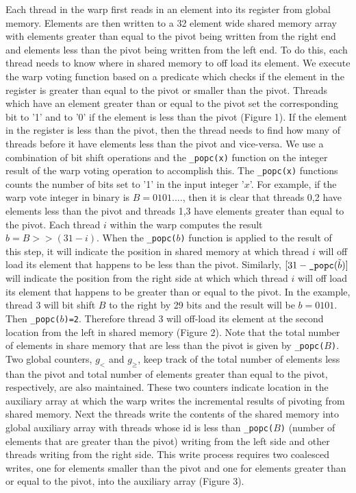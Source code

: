 \documentclass[10pt]{article}
\begin{document}
Each thread in the warp first reads in an element into its register from global memory. Elements are then written to a 32 element wide shared memory array with elements greater than equal to the pivot being written from the right end and elements less than the pivot being written from the left end. To do this, each thread needs to know where in shared memory to off load its element.  We execute the warp voting function based on a predicate which checks if the element in the register is greater than equal to the pivot or smaller than the pivot.  Threads which have an element greater than or equal to the pivot set the corresponding bit to '1' and to '0' if the element is less than the pivot (Figure 1). If the element in the register is less than the pivot, then the thread needs to find how many of threads before it have elements less than the pivot and vice-versa. We use a combination of bit shift operations and the \texttt{\_popc(x)} function on the integer result of the warp voting operation to accomplish this. The \texttt{\_popc(x)} functions counts the number of bits set to '1' in the input integer '$x$'. For example, if the warp vote integer in binary is $B=0101....$, then it is clear that threads 0,2  have elements less than the pivot and threads 1,3 have elements greater than equal to the pivot. Each thread $i$ within the warp computes the result $b=B>>(31-i)$.  When the  \texttt{\_popc($b$)} function is applied to the result of this step, it will indicate the position in shared memory at which thread $i$ will off load its element that happens to be less than the pivot. Similarly, $[31-\mbox{\texttt{\_popc}}(\tilde{b})]$ will indicate the position from the right side at which which thread $i$ will off load its element that happens to be greater than or equal to the pivot. In the example, thread 3 will bit shift $B$ to the right by 29 bits and the result will be $b=0101$. Then \texttt{\_popc($b$)=2}. Therefore thread 3 will off-load its element at the second location from the left in shared memory (Figure 2).  Note that the total number of elements in share memory that are less than the pivot is given by \texttt{\_popc($B$)}. Two global counters, $g_<$ and $g_{\ge}$, keep track of the total number of elements less than the pivot and total number of elements greater than equal to the pivot, respectively, are also maintained. These two counters indicate location in the auxiliary array at which the warp writes the incremental results of pivoting from shared memory.  Next the threads write the contents of the shared memory into global auxiliary array with threads whose id is less than \texttt{\_popc($B$)} (number of elements that are greater than the pivot) writing from the left side and other threads writing from the right side. This write process requires two coalesced writes, one for elements smaller than the pivot and one for elements greater than or equal to the pivot, into the auxiliary array (Figure 3). \\
\end{document}
